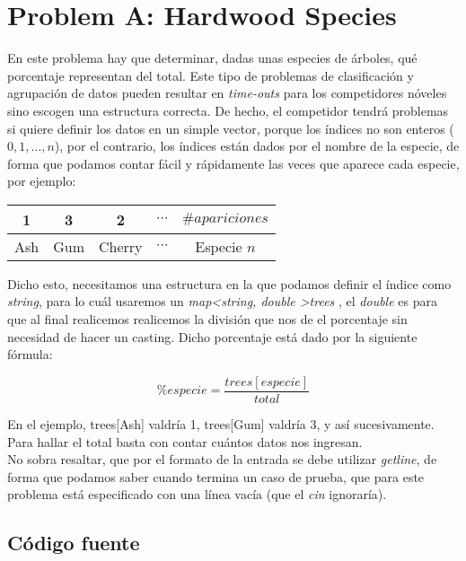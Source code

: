 \chapter{Problem A: Hardwood Species}

En este problema hay que determinar, dadas unas especies de árboles, qué porcentaje representan del total. Este tipo de problemas de clasificación y agrupación de datos pueden resultar en \emph{time-outs} para los competidores nóveles sino escogen una estructura correcta. De hecho, el competidor tendrá problemas si quiere definir los datos en un simple vector, porque los índices no son enteros ($0,1,\dots,n$), por el contrario, los índices están dados por el nombre de la especie, de forma que podamos contar fácil y rápidamente las veces que aparece cada especie, por ejemplo:

\begin{center}
\begin{tabular}{c c c c c} 
	\hline	 
	\multicolumn{1}{|c}{1} &
	\multicolumn{1}{|c}{3} &
	\multicolumn{1}{|c}{2} &
	\multicolumn{1}{|c}{$\cdots$} &
	\multicolumn{1}{|c|}{$\# apariciones$} \\ \hline		
	\multicolumn{1}{c}{Ash} &
	\multicolumn{1}{c}{Gum} & 
	\multicolumn{1}{c}{Cherry} &
	\multicolumn{1}{c}{$\cdots$} &
	\multicolumn{1}{c}{Especie $n$} 	
\end{tabular}
\end{center}

Dicho esto, necesitamos una estructura en la que podamos definir el índice como \emph{string}, para lo cuál usaremos un \emph{map\textless string, double \textgreater trees }, el \emph{double} es para que al final realicemos realicemos la división que nos de el porcentaje sin necesidad de hacer un casting. Dicho porcentaje está dado por la siguiente fórmula: 

\begin{equation}
\% especie = \frac{trees[especie]}{total}
\end{equation}

En el ejemplo, trees[Ash] valdría 1, trees[Gum] valdría 3, y así sucesivamente. Para hallar el total basta con contar cuántos datos nos ingresan. \\

No sobra resaltar, que por el formato de la entrada se debe utilizar \emph{getline}, de forma que podamos saber cuando termina un caso de prueba, que para este problema está especificado con una línea vacía (que el \emph{cin} ignoraría).

\newpage

\section*{Código fuente}




